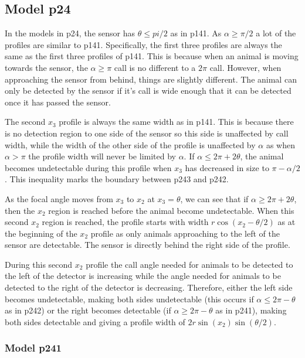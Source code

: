 \subsection{Model p24} \label{p24}

In the models in p24, the sensor has $\theta \le pi/2$ as in p141. As $\alpha \ge \pi/2$ a lot of the profiles are similar to p141. Specifically, the first three profiles are always the same as the first three profiles of p141. This is because when an animal is moving towards the sensor, the $\alpha \ge \pi$ call is no different to a $2\pi$ call. However, when approaching the sensor from behind, things are slightly different. The animal can only be detected by the sensor if it's call is wide enough that it can be detected once it has passed the sensor. 

The second $x_3$ profile is always the same width as in p141. This is because there is no detection region to one side of the sensor so this side is unaffected by call width, while the width of the other side of the profile is unaffected by $\alpha$ as when $\alpha>\pi$ the profile width will never be limited by $\alpha$. If $\alpha \le 2\pi + 2\theta$, the animal becomes undetectable during this profile when  $x_3$ has decreased in size to $\pi - \alpha/2$. This inequality marks the boundary between p243 and p242. 

As the focal angle moves from $x_3$ to $x_2$  at $x_3=\theta$, we can see that if $\alpha \ge 2\pi + 2\theta$, then the $x_2$ region is reached before the animal become undetectable. When this second $x_2$ region is reached, the profile starts with width $r\cos(x_2 - \theta/2)$ as at the beginning of the $x_2$ profile as only animals approaching to the left of the sensor are detectable. The sensor is directly behind the right side of the profile.

During this second $x_2$ profile the call angle needed for animals to be detected to the left of the detector is increasing while the angle needed for animals to be detected to the right of the detector is decreasing. Therefore, either the left side becomes undetectable, making both sides undetectable (this occurs if $\alpha \le 2\pi - \theta$ as in p242) or the right becomes detectable (if $\alpha \ge 2\pi - \theta$ as in p241), making both sides detectable and giving a profile width of $2r\sin(x_2)\sin(\theta/2)$.


\subsubsection{Model p241} \label{p241}

